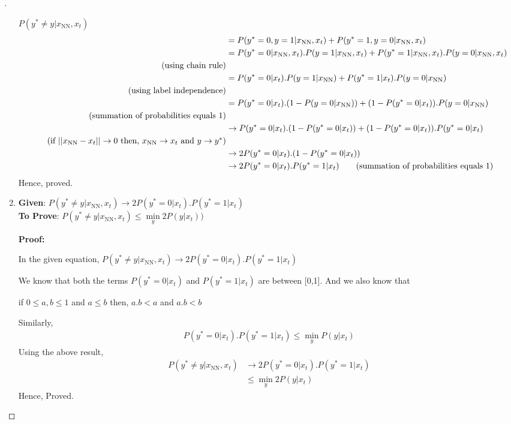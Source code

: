 \documentclass[a4paper, 12pt]{article}
\begin{document}
\begin{proof}[]
\begin{enumerate}[label={\color{blue}{\textbf{2.\arabic*})}}]
        $P(y^* \neq y|x_{\text{NN}},x_t) $
        \begin{align*}
            &= P(y^*=0,y=1|x_{\text{NN}},x_t) + P(y^*=1,y=0|x_{\text{NN}},x_t)
            \\
            &= P(y^*=0|x_{\text{NN}},x_t).P(y=1|x_{\text{NN}},x_t) + P(y^*=1|x_{\text{NN}},x_t).P(y=0|x_{\text{NN}},x_t)
            \\
            \tag*{(using chain rule)}\\
            &= P(y^*=0|x_t).P(y=1|x_{\text{NN}}) + P(y^*=1|x_t).P(y=0|x_{\text{NN}})
            \\
            \tag*{(using label independence)}\\
            &= P(y^*=0|x_t).(1 - P(y=0|x_{\text{NN}})) + (1 - P(y^*=0|x_t)).P(y=0|x_{\text{NN}})
            \\
            \tag*{(summation of probabilities equals 1)}\\
            &\to P(y^*=0|x_t).(1 - P(y^*=0|x_t)) + (1 - P(y^*=0|x_t)).P(y^*=0|x_t)
            \\
            \tag*{(if $||x_{\text{NN}} - x_t|| \to 0$ then, $x_{\text{NN}} \to x_t$ and $y \to y^*$)}\\
            &\to 2P(y^*=0|x_t).(1 - P(y^*=0|x_t))
            \\
            &\to 2P(y^*=0|x_t).P(y^*=1|x_t) \tag*{(summation of probabilities equals 1)}
        \end{align*}
        Hence, proved.
        
    \item 
        \textbf{Given}: $P(y^* \neq y|x_{\text{NN}},x_t) \to 2P(y^*=0|x_t).P(y^*=1|x_t)$ \\
        \textbf{To Prove}: $P(y^* \neq y|x_{\text{NN}},x_t) \leq  \min\limits_y 2P(y|x_t)) $ 
        \smallskip
        
        \textbf{Proof:}
        
        In the given equation, $P(y^* \neq y|x_{\text{NN}},x_t) \to 2P(y^*=0|x_t).P(y^*=1|x_t)$
        
        We know that both the terms $P(y^*=0|x_t)$ and $P(y^*=1|x_t)$ are between [0,1]. And we also know that 
        
        if $0 \leq a, b \leq 1$ and $a \leq b$ then, $a.b < a$ and $a.b < b$ 
        
        Similarly, 
        \begin{align*}
            P(y^*=0|x_t).P(y^*=1|x_t) \leq \min\limits_y P(y|x_t) \tag*{(eq 1)}
        \end{align*}
        Using the above result,
        \begin{align*}
            P(y^* \neq y|x_{\text{NN}},x_t)  &\to 2P(y^*=0|x_t).P(y^*=1|x_t) \\
            &\leq  \min\limits_y 2P(y|x_t) \tag*{(using result in eq 1)}
        \end{align*}
        Hence, Proved.
        

\end{enumerate}
\end{proof}
\end{document}
